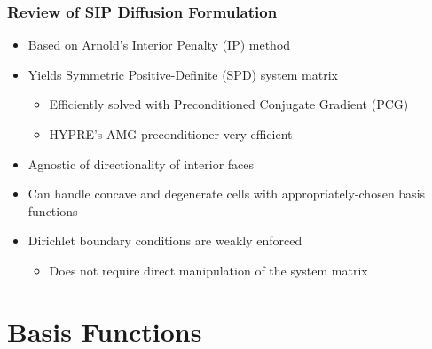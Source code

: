 \documentclass[]{beamer}
\begin{document}
\begin{frame}[t]\frametitle{Review of SIP Diffusion Formulation}
	\begin{itemize}
		\item Based on Arnold's Interior Penalty (IP) method
		\item Yields Symmetric Positive-Definite (SPD) system matrix
		\begin{itemize}
			\item Efficiently solved with Preconditioned Conjugate Gradient (PCG)
			\item HYPRE's AMG preconditioner very efficient
		\end{itemize}
		\item Agnostic of directionality of interior faces
		\item Can handle concave and degenerate cells with appropriately-chosen basis functions
		\item Dirichlet boundary conditions are weakly enforced
		\begin{itemize}
			\item Does not require direct manipulation of the system matrix 
		\end{itemize}
	\end{itemize}
\end{frame}
\section{Basis Functions}
\end{document}

